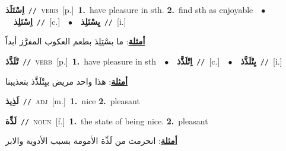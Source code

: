 \documentclass[10pt,a4paper,twoside]{article} %
\begin{document}
\begin{multicols}{2}
{\setlength\topsep{0pt}\textbf{\foreignlanguage{arabic}{اِسْتَلَذ}}\ {\color{gray}\texttt{//}\color{black}}\ \textsc{verb}\ [p.]\ \textbf{1.}~have pleasure in sth.  \textbf{2.}~find sth as enjoyable\ \ $\bullet$\ \ \setlength\topsep{0pt}\textbf{\foreignlanguage{arabic}{اِسْتَلِذ}}\ {\color{gray}\texttt{//}\color{black}}\ [c.]\ \ $\bullet$\ \ \setlength\topsep{0pt}\textbf{\foreignlanguage{arabic}{يِسْتَلِذ}}\ {\color{gray}\texttt{//}\color{black}}\ [i.]\  \begin{flushright}\color{gray}\foreignlanguage{arabic}{\textbf{\underline{\foreignlanguage{arabic}{أمثلة}}}: ما بسْتِلِذ بطعم العكوب المفرَّز أبداً}\end{flushright}\color{black}} \vspace{2mm}

{\setlength\topsep{0pt}\textbf{\foreignlanguage{arabic}{تْلَذَّذ}}\ {\color{gray}\texttt{//}\color{black}}\ \textsc{verb}\ [p.]\ \textbf{1.}~have pleasure in sth\ \ $\bullet$\ \ \setlength\topsep{0pt}\textbf{\foreignlanguage{arabic}{اِتْلَذَّذ}}\ {\color{gray}\texttt{//}\color{black}}\ [c.]\ \ $\bullet$\ \ \setlength\topsep{0pt}\textbf{\foreignlanguage{arabic}{يِتْلَذَّذ}}\ {\color{gray}\texttt{//}\color{black}}\ [i.]\  \begin{flushright}\color{gray}\foreignlanguage{arabic}{\textbf{\underline{\foreignlanguage{arabic}{أمثلة}}}: هذا واحد مريض بيِتْلَذَّذ بتعذيبنا}\end{flushright}\color{black}} \vspace{2mm}

{\setlength\topsep{0pt}\textbf{\foreignlanguage{arabic}{لَذِيذ}}\ {\color{gray}\texttt{//}\color{black}}\ \textsc{adj}\ [m.]\ \textbf{1.}~nice  \textbf{2.}~pleasant\ } \vspace{2mm}

{\setlength\topsep{0pt}\textbf{\foreignlanguage{arabic}{لَذِّة}}\ {\color{gray}\texttt{//}\color{black}}\ \textsc{noun}\ [f.]\ \textbf{1.}~the state of being nice.  \textbf{2.}~pleasant\  \begin{flushright}\color{gray}\foreignlanguage{arabic}{\textbf{\underline{\foreignlanguage{arabic}{أمثلة}}}: انحرمت من لَذِّة الأمومة بسبب الأدوية والابر}\end{flushright}\color{black}} \vspace{2mm}


\end{multicols}
\end{document}

